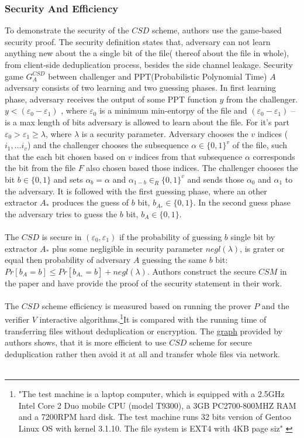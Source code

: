 \documentclass[12pt]{article}
\begin{document}
\subsubsection{Security And Efficiency}
\label{subsub:secAndeff4}

To demonstrate the security of the $CSD$ scheme, authors use the game-based security proof. The security definition states that, adversary can not learn anything new about the a single bit of the file( thereof about the file in  whole), from client-side deduplication process, besides the side channel leakage. Security game $G^{CSD}_A$ between challenger and PPT(Probabilistic Polynomial Time) $A$ adversary consists of two learning and two guessing phases. In first learning phase, adversary receives the output of some PPT function $y$ from the challenger. $y < (\varepsilon_0 - \varepsilon_1)$ , where  $\varepsilon_0$ is a minimum min-entorpy of the file and  $(\varepsilon_0 - \varepsilon_1)$ -- is a max length of bits adversary is allowed to learn about the file. For it's part $\varepsilon_0>\varepsilon_1  \geq\lambda$, where $\lambda$ is a security parameter. Adversary chooses the $v$ indices ($i_1, ...i_v$)  and the challenger chooses the subsequence $\alpha \in \{0,1\}^v$  of the file, such that the each bit chosen based on $v$ indices from that subsequence $\alpha$ corresponds the bit from the file $F$ also chosen based those indices. The challenger chooses the bit  $b \in \{0,1\}$ and sets $\alpha_b=\alpha$ and $\alpha_{1-b}  \in_R \{0,1\}^v$ and sends those $\alpha_0$ and $\alpha_1$ to the adversary. It is followed with the first guessing phase, where an other extractor $A_*$ produces the guess of $b$ bit, $b_{A_*} \in \{0,1\}$. In the second guess phase the adversary tries to guess the $b$ bit, $b_A \in \{0,1\}$.\\\\
The $CSD$ is secure in $(\varepsilon_0, \varepsilon_1)$ if the probability of guessing $b$ single bit by extractor $A_*$ plus some negligible in security parameter $negl(\lambda)$, is grater or equal then probability of adversary $A$ guessing the same $b$ bit: $Pr[b_A=b]\leq Pr[b_{A_*}=b]+negl(\lambda)$. Authors construct the secure $CSM$ in the paper and have provide the proof of the security statement in their work.\\\\
The $CSD$ scheme efficiency is measured based on running the prover $P$ and the verifier $V$ interactive algorithms.\footnote{"The test machine is a laptop computer, which is equipped
with a 2.5GHz Intel Core 2 Duo mobile CPU (model T9300), a 3GB PC2700-800MHZ RAM and a 7200RPM hard disk. The test machine runs 32 bits version of Gentoo Linux OS with kernel 3.1.10. The file system is EXT4 with 4KB page siz" \cite{Leakage-Resilient}}It is compared with the running time of transferring files without deduplication or encryption. The \hyperref[fig:CSD]{graph} provided by authors shows, that it is more efficient to use $CSD$ scheme for secure deduplication rather then avoid it at all and transfer whole files via network.\\\\
\end{document}

